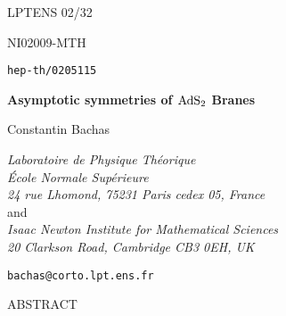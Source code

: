 \documentclass[a4paper,12pt,oneside]{article}
\begin{document}
\thispagestyle{empty}
\setcounter{page}{0}
\renewcommand{\theequation}{\thesection.\arabic{equation}}


\def\a{{\alpha}}
\def\ap{{\a}^{\prime}}
\def\b{{\beta}}
\def\d{{\delta}}
\def\g{{\gamma}}
\def\e{{\epsilon}}
\def\z{{\zeta}}
\def\ve{{\varepsilon}}
\def\vf{{\varphi}}
\def\m\mu
\def\n{{\nu}}
\def\u{{\Upsilon}}
\def\l{{\lambda}}
\def\s{{\sigma}}
\def\t{{\tau}}
\def\th{{\theta}}
\def\vt{{\vartheta}}
\def\nc{noncommutative\ }
\def\npt{non-perturbative\ }
\def\hp{\hat\partial}
\def\kk{{\kappa}}
\def\IR{{\bf R}}
\def\CM{{\cal M}}



{\hfill{LPTENS 02/32}}

{\hfill{NI02009-MTH}}

{\hfill{\tt hep-th/0205115}}

\vspace{2cm}

\begin{center}
{\bf Asymptotic symmetries of ${\rm AdS}_2$ Branes}

\vspace{1.4cm}

Constantin Bachas

\vspace{.2cm}

{\em Laboratoire de Physique Th\'eorique}\\
{\em \'Ecole Normale Sup\'erieure}\\
{\em 24 rue Lhomond, 75231 Paris cedex 05, France} \\
\vspace{.2cm}
{ and} \\
\vspace{.2cm}
{ \em Isaac Newton Institute for Mathematical Sciences
} \\
{ \em 20 Clarkson Road, Cambridge CB3 0EH, UK } \\
\end{center}

\vspace{-.1cm}

\centerline{{\tt bachas@corto.lpt.ens.fr}}

\vspace{1cm}

\centerline{ABSTRACT}

\vspace{- 4 mm}
\end{document}
